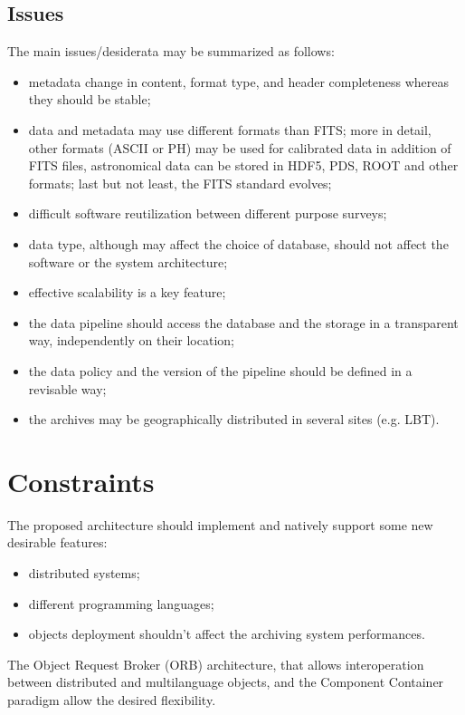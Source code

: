 \documentclass[11pt,twoside]{article}
\begin{document}
\subsection{Issues}
The main issues/desiderata may be summarized as follows:
\begin{itemize}
\item metadata change in content, format type, and header completeness whereas
they should be stable;
\item data and metadata may use different formats than FITS; more in detail, 
other formats (ASCII or PH) may be used for calibrated data in addition of FITS
files, astronomical data can be stored in HDF5, PDS, ROOT and other formats;
last but not least, the FITS standard evolves;
\item difficult software reutilization between different purpose surveys;
\item data type, although may affect the choice of database, should not affect
the software or the system architecture;
\item effective scalability is a key feature;
\item the data pipeline should access the database and the storage in a
transparent way, independently on their location;
\item the data policy and the version of the pipeline should be defined in a revisable way;
\item the archives may be geographically distributed in several sites (e.g. LBT).
\end{itemize}

\section{Constraints}
The proposed architecture should implement and natively support some new desirable features:
\begin{itemize}
  \item distributed systems;
  \item different programming languages;
  \item objects deployment shouldn't affect the archiving system performances.
\end{itemize}
The Object Request Broker (ORB) architecture, that allows interoperation between
distributed and multilanguage objects, and the Component Container paradigm allow
the desired flexibility.
\end{document}
